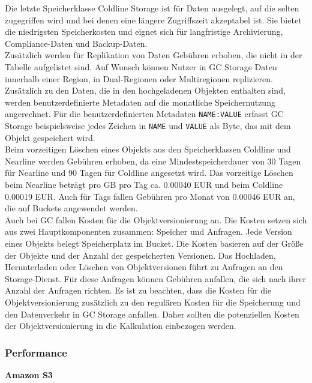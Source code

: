Die letzte Speicherklasse Coldline Storage ist für Daten ausgelegt, auf die selten zugegriffen wird und bei denen eine längere Zugriffszeit akzeptabel ist. Sie bietet die niedrigsten Speicherkosten und eignet sich für langfristige Archivierung, Compliance-Daten und Backup-Daten.\\ 

Zusätzlich werden für Replikation von Daten Gebühren erhoben, die nicht in der Tabelle aufgelistet sind. Auf Wunsch können Nutzer in GC Storage Daten innerhalb einer Region, in Dual-Regionen oder Multiregionen replizieren. Zusätzlich zu den Daten, die in den hochgeladenen Objekten enthalten sind, werden benutzerdefinierte Metadaten auf die monatliche Speichernutzung angerechnet. Für die benutzerdefinierten Metadaten \verb|NAME:VALUE| erfasst GC Storage beispielsweise jedes Zeichen in \verb|NAME| und \verb|VALUE| als Byte, das mit dem Objekt gespeichert wird.\\

Beim vorzeitigen Löschen eines Objekts aus den Speicherklassen Coldline und Nearline werden Gebühren erhoben, da eine Mindestspeicherdauer von 30 Tagen für Nearline und 90 Tagen für Coldline angesetzt wird. Das vorzeitige Löschen beim Nearline beträgt pro GB pro Tag ca. 0.00040 EUR und beim Coldline 0.00019 EUR. Auch für Tags fallen Gebühren pro Monat von 0.00046 EUR an, die auf Buckets angewendet werden.\\

Auch bei GC fallen Kosten für die Objektversionierung an. Die Kosten setzen sich aus zwei Hauptkomponenten zusammen: Speicher und Anfragen. Jede Version eines Objekts belegt Speicherplatz im Bucket. Die Kosten basieren auf der Größe der Objekte und der Anzahl der gespeicherten Versionen. Das Hochladen, Herunterladen oder Löschen von Objektversionen führt zu Anfragen an den Storage-Dienst. Für diese Anfragen können Gebühren anfallen, die sich nach ihrer Anzahl der Anfragen richten. Es ist zu beachten, dass die Kosten für die Objektversionierung zusätzlich zu den regulären Kosten für die Speicherung und den Datenverkehr in GC Storage anfallen. Daher sollten die potenziellen Kosten der Objektversionierung in die Kalkulation einbezogen werden.

\newpage

\subsubsection{Performance}

\textbf{Amazon S3}\\

